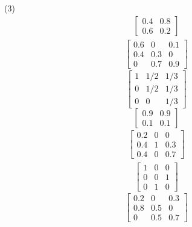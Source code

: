 \begin{tasks}[style=enumerate](3)
\task
  \begin{align*}
    \begin{bmatrix}
      0.4 & 0.8 \\ 0.6 & 0.2
    \end{bmatrix}
  \end{align*}
\task
  \begin{align*}
    \begin{bmatrix}
      0.6 & 0 & 0.1 \\
      0.4 & 0.3 & 0 \\
      0 & 0.7 & 0.9
    \end{bmatrix}
  \end{align*}
\task
  \begin{displaymath}
    \begin{bmatrix}
      1 & 1/2 & 1/3 \\
      0 & 1/2 & 1/3 \\
      0 & 0 & 1/3
    \end{bmatrix}
  \end{displaymath}
\task
  \begin{displaymath}
    \begin{bmatrix}
      0.9 & 0.9 \\
      0.1 & 0.1
    \end{bmatrix}
  \end{displaymath}
\task
  \begin{align*}
    \begin{bmatrix}
      0.2 & 0 & 0 \\
      0.4 & 1 & 0.3 \\
      0.4 & 0 & 0.7
    \end{bmatrix}
  \end{align*}
\task
  \begin{align*}
    \begin{bmatrix}
      1 & 0 & 0 \\
      0 & 0 & 1 \\
      0 & 1 & 0
    \end{bmatrix}
  \end{align*}
\task
  \begin{displaymath}
    \begin{bmatrix}
      0.2 & 0 & 0.3 \\
      0.8 & 0.5 & 0 \\
      0 & 0.5 & 0.7
    \end{bmatrix}
  \end{displaymath}

\end{tasks}
